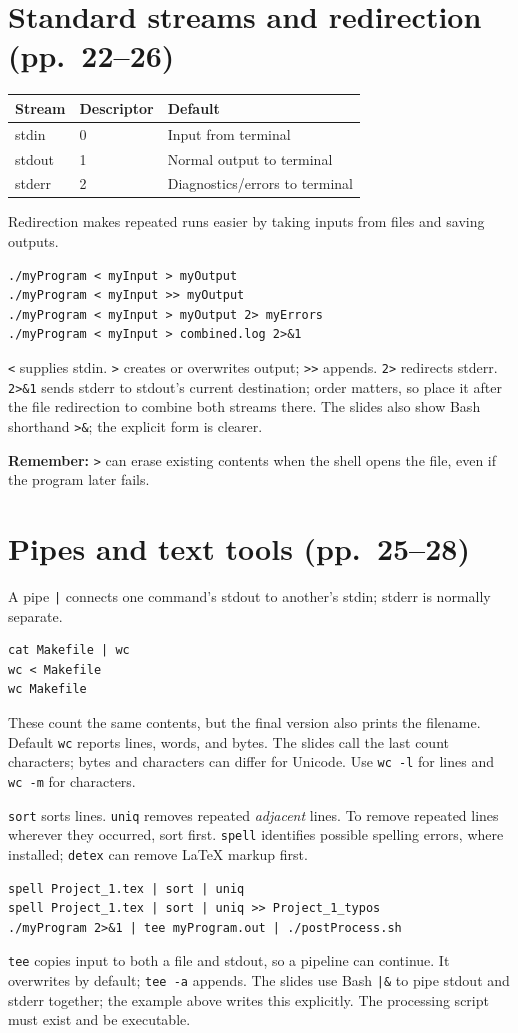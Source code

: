 \documentclass[11pt,a4paper]{article}
\begin{document}
\section{Standard streams and redirection (pp.~22--26)}
\begin{center}\begin{tabular}{lll}
\toprule Stream & Descriptor & Default \\ \midrule
stdin & 0 & Input from terminal \\
stdout & 1 & Normal output to terminal \\
stderr & 2 & Diagnostics/errors to terminal \\
\bottomrule\end{tabular}\end{center}
Redirection makes repeated runs easier by taking inputs from files and saving outputs.
\begin{lstlisting}
./myProgram < myInput > myOutput
./myProgram < myInput >> myOutput
./myProgram < myInput > myOutput 2> myErrors
./myProgram < myInput > combined.log 2>&1
\end{lstlisting}
\texttt{<} supplies stdin. \texttt{>} creates or overwrites output; \texttt{>>} appends. \texttt{2>} redirects stderr. \texttt{2>\&1} sends stderr to stdout's current destination; order matters, so place it after the file redirection to combine both streams there. The slides also show Bash shorthand \texttt{>\&}; the explicit form is clearer.

\textbf{Remember:} \texttt{>} can erase existing contents when the shell opens the file, even if the program later fails.
\section{Pipes and text tools (pp.~25--28)}
A pipe \texttt{|} connects one command's stdout to another's stdin; stderr is normally separate.
\begin{lstlisting}
cat Makefile | wc
wc < Makefile
wc Makefile
\end{lstlisting}
These count the same contents, but the final version also prints the filename. Default \texttt{wc} reports lines, words, and bytes. The slides call the last count characters; bytes and characters can differ for Unicode. Use \texttt{wc -l} for lines and \texttt{wc -m} for characters.

\texttt{sort} sorts lines. \texttt{uniq} removes repeated \emph{adjacent} lines. To remove repeated lines wherever they occurred, sort first. \texttt{spell} identifies possible spelling errors, where installed; \texttt{detex} can remove LaTeX markup first.
\begin{lstlisting}
spell Project_1.tex | sort | uniq
spell Project_1.tex | sort | uniq >> Project_1_typos
./myProgram 2>&1 | tee myProgram.out | ./postProcess.sh
\end{lstlisting}
\texttt{tee} copies input to both a file and stdout, so a pipeline can continue. It overwrites by default; \texttt{tee -a} appends. The slides use Bash \texttt{|\&} to pipe stdout and stderr together; the example above writes this explicitly. The processing script must exist and be executable.
\end{document}
